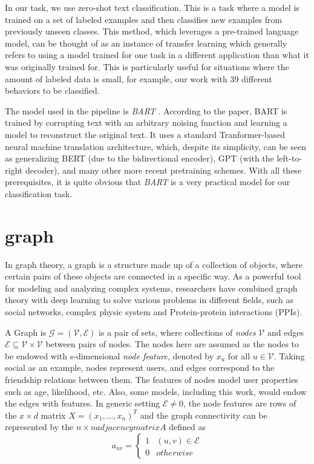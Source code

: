 In our task, we use zero-shot text classification. This is a task where a model is trained on a set of labeled examples and then classifies new examples from previously unseen classes. This method, which leverages a pre-trained language model, can be thought of as an instance of transfer learning which generally refers to using a model trained for one task in a different application than what it was originally trained for. This is particularly useful for situations where the amount of labeled data is small, for example, our work with 39 different behaviors to be classified.

The model used in the pipeline is \textit{BART} \cite{lewis2019bartdenoisingsequencetosequencepretraining}. According to the paper, BART is trained by corrupting text with an arbitrary noising function and learning a model to reconstruct the original text. It uses a standard Tranformer-based neural machine translation architecture, which, despite its simplicity, can be seen as generalizing BERT (due to the bidirectional encoder), GPT (with the left-to-right decoder), and many other more recent pretraining schemes. With all these prerequisites, it is quite obvious that \textit{BART} is a very practical model for our classification task.

\section{graph}
In graph theory, a graph is a structure made up of a collection of objects, where certain pairs of these objects are connected in a specific way\cite{zhou2020graph}. As a powerful tool for modeling and analyzing complex systems, researchers have combined graph theory with deep learning to solve various problems in different fields, such as social networks\cite{wu2020graph}, complex physic system\cite{sanchez2018graph} and Protein-protein interactions (PPIs)\cite{NIPS2017_f5077839}.

A Graph is $\mathcal{G} = (\mathcal{V}, \mathcal{E})$ is a pair of sets, where collections of \textit{nodes} $\mathcal{V}$ and edges $\mathcal{E} \subseteq \mathcal{V}\times \mathcal{V}$ between pairs of nodes. The nodes here are assumed as the nodes to be endowed with s-dimensional \textit{node feature}, denoted by $x_u$ for all $u\in \mathcal{V}$. Taking social as an example, nodes represent users, and edges correspond to the friendship relations between them. The features of nodes model user properties such as age, likelihood, etc. Also, some models, including this work, would endow the edges with features. In generic setting $\mathcal{E} \neq 0$, the node features are rows of the $x\times d$ matrix $X=(x_1,\ldots,x_n)^T$ and the graph connectivity can be represented by the $n\times n adjacency matrix A $ defined as 
$$a_{uv} = \left\{ \begin{array}{rcl}
1 & (u,v)\in \mathcal{E} \\ 0 & otherwise 
\end{array}\right.$$

